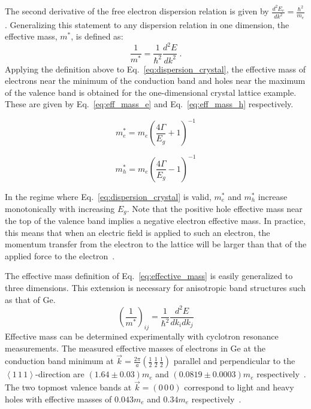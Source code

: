 The second derivative of the free electron dispersion relation is given by $\frac{d^2E_e}{dk^2} = \frac{\hbar^2}{m_e}$. Generalizing this statement to any dispersion relation in one dimension, the effective mass, $m^*$, is defined as:
\begin{equation}
	\frac{1}{m^*} = \frac{1}{\hbar^2}\frac{d^2E}{dk^2}~.
	\label{eq:effective_mass}
\end{equation}
Applying the definition above to Eq.~\ref{eq:dispersion_crystal}, the effective mass of electrons near the minimum of the conduction band and holes near the maximum of the valence band is obtained for the one-dimensional crystal lattice example. These are given by Eq.~\ref{eq:eff_mass_e} and Eq.~\ref{eq:eff_mass_h} respectively.
\vspace{-0.5\baselineskip}
\begin{multicols}{2}
	\begin{equation}
		m_{e}^* = m_e\left(\frac{4\Gamma}{E_g} + 1\right)^{-1}
	\label{eq:eff_mass_e}
	\end{equation}

	\begin{equation}
		m_{h}^* = m_e\left(\frac{4\Gamma}{E_g} - 1\right)^{-1}
	\label{eq:eff_mass_h}
	\end{equation}
\end{multicols}
\noindent In the regime where Eq.~\ref{eq:dispersion_crystal} is valid, $m_e^*$ and $m_h^*$ increase monotonically with increasing $E_g$. Note that the positive hole effective mass near the top of the valence band implies a negative electron effective mass. In practice, this means that when an electric field is applied to such an electron, the momentum transfer from the electron to the lattice will be larger than that of the applied force to the electron~\cite{kittel}.

The effective mass definition of Eq.~\ref{eq:effective_mass} is easily generalized to three dimensions. This extension is necessary for anisotropic band structures such as that of Ge.
\begin{equation}
	\left(\frac{1}{m^*}\right)_{ij} = \frac{1}{\hbar^2}\frac{d^2E}{dk_i dk_j}
	\label{eq:effective_mass_3d}
\end{equation}
Effective mass can be determined experimentally with cyclotron resonance measurements. The measured effective masses of electrons in Ge at the conduction band minimum at $\vec{k} = \frac{2\pi}{a}\left(\frac{1}{2}\,\frac{1}{2}\,\frac{1}{2}\right)$ parallel and perpendicular to the $\left<1\,1\,1\right>$-direction are $(1.64 \pm 0.03)m_e$ and $(0.0819 \pm 0.0003)m_e$ respectively~\cite{eff_mass_e}. The two topmost valence bands at $\vec{k} = \left(0\,0\,0\right)$ correspond to light and heavy holes with effective masses of $0.043m_e$ and $0.34m_e$ respectively~\cite{kittel}.

